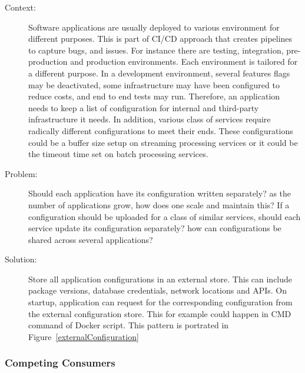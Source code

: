 \documentclass{bmcart}
\begin{document}
\begin{description}
  \item[Context:] Software applications are usually deployed to various environment for different purposes. This is part of CI/CD approach that creates pipelines to capture bugs, and issues. For instance there are testing, integration, pre-production and production environments. Each environment is tailored for a different purpose. In a development environment, several features flags may be deactivated, some infrastructure may have been configured to reduce costs, and end to end tests may run. Therefore, an application needs to keep a list of configuration for internal and third-party infrastructure it needs. In addition, various class of services require radically different configurations to meet their ends. These configurations could be a buffer size setup on streaming processing services or it could be the timeout time set on batch processing services. 
  \item[Problem:] Should each application have its configuration written separately? as the number of applications grow, how does one scale and maintain this? If a configuration should be uploaded for a class of similar services, should each service update its configuration separately? how can configurations be shared across several applications? 
  \item[Solution:] Store all application configurations in an external store. This can include package versions, database credentials, network locations and APIs. On startup, application can request for the corresponding configuration from the external configuration store. This for example could happen in CMD command of Docker script. This pattern is portrated in Figure~\ref{externalConfiguration}  
\end{description}


\subsubsection{Competing Consumers}
\end{document}
